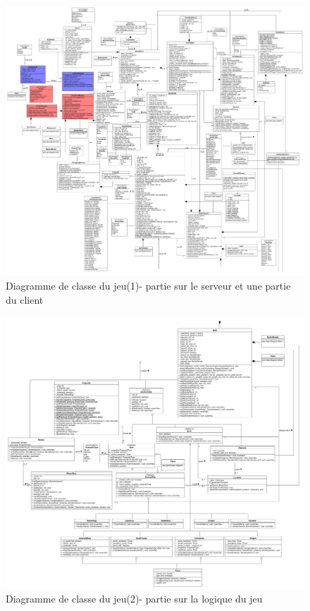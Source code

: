 \documentclass[french]{article}
\begin{document}
\label{class diagram:game}
\begin{figure}[!htbp]
    \centering
    \includegraphics[scale=0.20, angle=90]{class_diagram/class_diagramm_client_server.png}
    \caption{Diagramme de classe du jeu(1)- partie sur le serveur et une partie du client}
    \label{class diagram:game-server}
\end{figure}

\begin{figure}[!htbp]
    \centering
    \includegraphics[scale=0.25, angle=90]{class_diagram/class_diagramm_game_logic.png}
    \caption{Diagramme de classe du jeu(2)- partie sur la logique du jeu}
    \label{class diagram:game-gameplay}
\end{figure}
\end{document}
